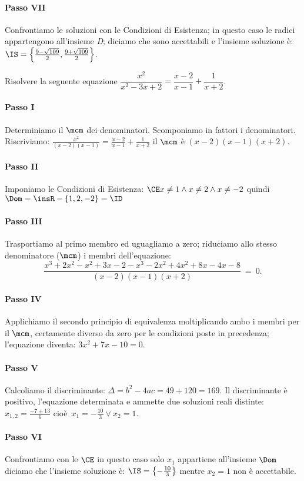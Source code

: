 \begin{exrig}
\begin{esempio}
 \paragraph{Passo VII} Confrontiamo le soluzioni con le Condizioni di Esistenza; 
in questo caso le radici appartengono all'insieme \emph{D}; diciamo che sono 
accettabili e l'insieme soluzione è: $\IS=\left\{\frac{9 - \sqrt{109}}{2}, 
\frac{9 +\sqrt{109}}{2} \right\}$.
 \end{esempio}

 \begin{esempio}
Risolvere la seguente equazione $\dfrac{x^{2}}{x^{2} - 3 x + 2}=\dfrac{x - 2}{x 
- 1} +\dfrac{1}{x + 2}$.
 \paragraph{Passo I} Determiniamo il $\mcm$ dei denominatori. Scomponiamo in 
fattori i denominatori. Riscriviamo: $\frac{x^{2}}{( x - 2 ) ( x - 1 )}=\frac{x 
- 2}{x - 1} +\frac{1}{x + 2}$ il $\mcm$ è $( x - 2 ) ( x - 1 ) ( x + 2 )$.
 \paragraph{Passo II} Imponiamo le Condizioni di Esistenza: $\CE x \neq 1 \wedge 
x \neq 2 \wedge x \neq - 2$ quindi $\Dom = \insR - \{ 1, 2, - 2 \}=\ID$
 \paragraph{Passo III} Trasportiamo al primo membro ed uguagliamo a zero; 
riduciamo allo stesso denominatore ($\mcm$) i membri dell'equazione: 
\[\frac{x^{3} + 2 x^{2} - x^{2} + 3 x - 2 - x^{3} - 2 x^{2} + 4x^{2} + 8 x - 4 x 
- 8}{( x - 2 ) ( x - 1 ) ( x + 2 )}~=~0.\]
 \paragraph{Passo IV} Applichiamo il secondo principio di equivalenza 
moltiplicando ambo i membri per il $\mcm$, certamente diverso da zero per le 
condizioni poste in precedenza; l'equazione diventa: $3 x^{2} + 7 x - 10 = 0$.
 \paragraph{Passo V} Calcoliamo il discriminante: $\Delta=b^{2} - 4 a c=49 + 
120=169$. Il discriminante è positivo, l'equazione determinata e ammette due 
soluzioni reali distinte: $x_{1,2}=\frac{- 7 \pm 13}{6}$ 
cioè~$x_{1}=-\frac{10}{3} \vee x_{2}=1$.
 \paragraph{Passo VI} Confrontiamo con le $\CE$ in questo caso solo $x_{1}$ 
appartiene all'insieme $\Dom$ diciamo che l'insieme soluzione è: 
$\IS=\left\{-\frac{10}{3}\right\}$ mentre $x_{2} = 1$ non è accettabile.
\end{esempio}
\end{exrig}
